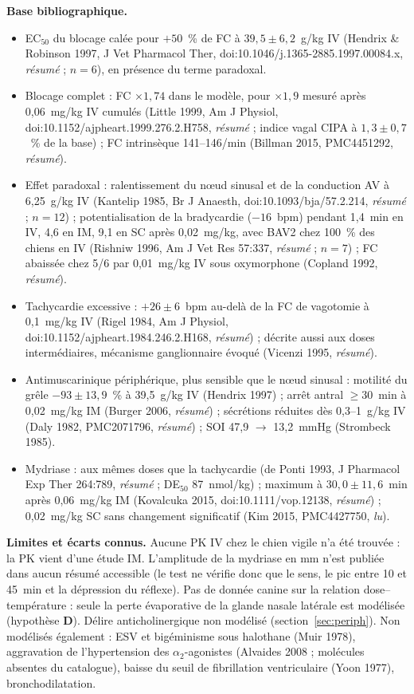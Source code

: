 \documentclass[10pt,a4paper]{article}
\newcommand{\evD}{\textcolor{red!70!black}{\textbf{D}}}
\newcommand{\acc}[1]{\textsl{#1}}
\newcommand{\limite}[1]{\par\textbf{Limites et écarts connus.} #1}
\newcommand{\sources}[1]{\par\textbf{Base bibliographique.} #1}
\begin{document}
\sources{
\begin{itemize}
\item EC$_{50}$ du blocage calée pour $+50$~\% de FC à $39{,}5 \pm 6{,}2$~\textmu g/kg IV (Hendrix \& Robinson 1997, J Vet Pharmacol Ther, doi:10.1046/j.1365-2885.1997.00084.x, \acc{résumé} ; $n = 6$), en présence du terme paradoxal.
\item Blocage complet : FC $\times 1{,}74$ dans le modèle, pour $\times 1{,}9$ mesuré après 0,06~mg/kg IV cumulés (Little 1999, Am J Physiol, doi:10.1152/ajpheart.1999.276.2.H758, \acc{résumé} ; indice vagal CIPA à $1{,}3 \pm 0{,}7$~\% de la base) ; FC intrinsèque 141--146/min (Billman 2015, PMC4451292, \acc{résumé}).
\item Effet paradoxal : ralentissement du nœud sinusal et de la conduction AV à 6,25~\textmu g/kg IV (Kantelip 1985, Br J Anaesth, doi:10.1093/bja/57.2.214, \acc{résumé} ; $n = 12$) ; potentialisation de la bradycardie ($-16$~bpm) pendant 1,4~min en IV, 4,6 en IM, 9,1 en SC après 0,02~mg/kg, avec BAV2 chez 100~\% des chiens en IV (Rishniw 1996, Am J Vet Res 57:337, \acc{résumé} ; $n = 7$) ; FC abaissée chez 5/6 par 0,01~mg/kg IV sous oxymorphone (Copland 1992, \acc{résumé}).
\item Tachycardie excessive : $+26 \pm 6$~bpm au-delà de la FC de vagotomie à 0,1~mg/kg IV (Rigel 1984, Am J Physiol, doi:10.1152/ajpheart.1984.246.2.H168, \acc{résumé}) ; décrite aussi aux doses intermédiaires, mécanisme ganglionnaire évoqué (Vicenzi 1995, \acc{résumé}).
\item Antimuscarinique périphérique, plus sensible que le nœud sinusal : motilité du grêle $-93 \pm 13{,}9$~\% à 39,5~\textmu g/kg IV (Hendrix 1997) ; arrêt antral $\geq 30$~min à 0,02~mg/kg IM (Burger 2006, \acc{résumé}) ; sécrétions réduites dès 0,3--1~\textmu g/kg IV (Daly 1982, PMC2071796, \acc{résumé}) ; SOI 47,9 $\to$ 13,2~mmHg (Strombeck 1985).
\item Mydriase : aux mêmes doses que la tachycardie (de Ponti 1993, J Pharmacol Exp Ther 264:789, \acc{résumé} ; DE$_{50}$ 87~nmol/kg) ; maximum à $30{,}0 \pm 11{,}6$~min après 0,06~mg/kg IM (Kovalcuka 2015, doi:10.1111/vop.12138, \acc{résumé}) ; 0,02~mg/kg SC sans changement significatif (Kim 2015, PMC4427750, \acc{lu}).
\end{itemize}}
\limite{Aucune PK IV chez le chien vigile n'a été trouvée : la PK vient d'une étude IM. L'amplitude
de la mydriase en mm n'est publiée dans aucun résumé accessible (le test ne vérifie donc que le
sens, le pic entre 10 et 45~min et la dépression du réflexe). Pas de donnée canine sur la
relation dose--température : seule la perte évaporative de la glande nasale latérale est modélisée
(hypothèse \evD{}). Délire anticholinergique non modélisé (section~\ref{sec:periph}). Non
modélisés également : ESV et bigéminisme sous halothane (Muir 1978), aggravation de
l'hypertension des $\alpha_2$-agonistes (Alvaides 2008 ; molécules absentes du catalogue), baisse
du seuil de fibrillation ventriculaire (Yoon 1977), bronchodilatation.}
\end{document}
